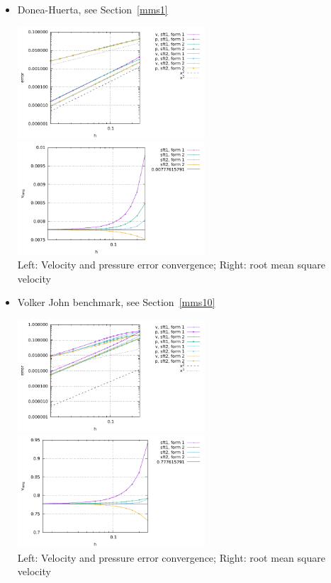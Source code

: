 \begin{itemize}
\item Donea-Huerta, see Section~\ref{mms1}

\begin{center}
\includegraphics[width=7cm]{python_codes/fieldstone_77/results/dh/errors}
\includegraphics[width=7cm]{python_codes/fieldstone_77/results/dh/vrms}\\
{\captionfont Left: Velocity and pressure error convergence; Right: 
root mean square velocity}
\end{center}

\item Volker John benchmark, see Section~\ref{mms10}

\begin{center}
\includegraphics[width=7cm]{python_codes/fieldstone_77/results/vj/errors}
\includegraphics[width=7cm]{python_codes/fieldstone_77/results/vj/vrms}\\
{\captionfont Left: Velocity and pressure error convergence; Right: 
root mean square velocity}
\end{center}

\end{itemize}

